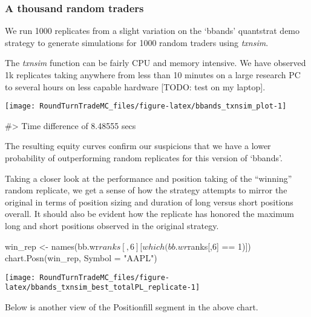 \hypertarget{a-thousand-random-traders}{%
\subsubsection{A thousand random
traders}\label{a-thousand-random-traders}}

We run 1000 replicates from a slight variation on the `bbands'
quantstrat demo strategy to generate simulations for 1000 random traders
using \emph{txnsim}.

The \emph{txnsim} function can be fairly CPU and memory intensive. We
have observed 1k replicates taking anywhere from less than 10 minutes on
a large research PC to several hours on less capable hardware {[}TODO:
test on my laptop{]}.

\begin{Schunk}


\begin{center}\texttt{[image: RoundTurnTradeMC\_files/figure-latex/bbands\_txnsim\_plot-1]} \end{center}

\begin{Soutput}
#> Time difference of 8.48555 secs
\end{Soutput}
\end{Schunk}

The resulting equity curves confirm our suspicions that we have a lower
probability of outperforming random replicates for this version of
`bbands'.

Taking a closer look at the performance and position taking of the
``winning'' random replicate, we get a sense of how the strategy
attempts to mirror the original in terms of position sizing and duration
of long versus short positions overall. It should also be evident how
the replicate has honored the maximum long and short positions observed
in the original strategy.

\begin{Schunk}
\begin{Sinput}
win_rep <- names(bb.wr$ranks[,6][which(bb.wr$ranks[,6] == 1)])
chart.Posn(win_rep, Symbol = "AAPL") 
\end{Sinput}


\begin{center}\texttt{[image: RoundTurnTradeMC\_files/figure-latex/bbands\_txnsim\_best\_totalPL\_replicate-1]} \end{center}

\end{Schunk}

Below is another view of the Positionfill segment in the above chart.


